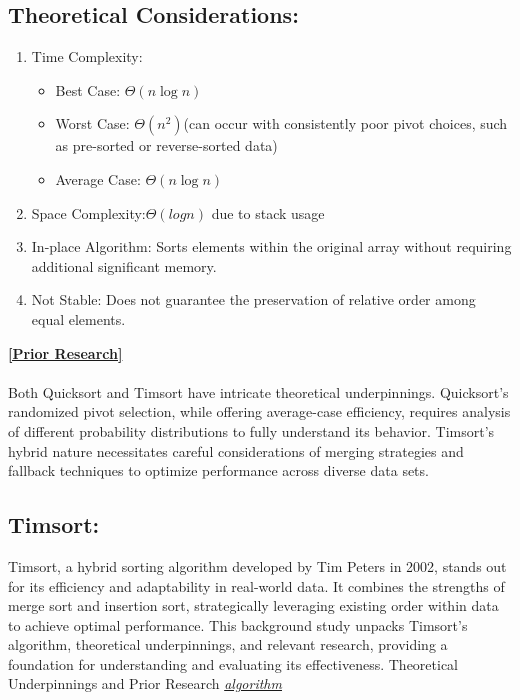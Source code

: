 \documentclass[a4paper, 9pt, twocolumn]{article}
\begin{document}
\subsection*{Theoretical Considerations:}
\begin{enumerate}
  \item Time Complexity:
        \begin{itemize}
          \item Best Case: $\Theta(n\log n)$
          \item Worst Case: $\Theta(n^2)$(can occur with consistently poor pivot choices, such as pre-sorted or reverse-sorted data)
          \item Average Case: $\Theta(n\log n)$
        \end{itemize}
  \item Space Complexity:$\Theta(log n)$ due to stack usage
  \item In-place Algorithm: Sorts elements within the original array without requiring additional significant memory.
  \item Not Stable: Does not guarantee the preservation of relative order among equal elements.
\end{enumerate}
\hyperref[hoare1961]{\textbf{[Prior Research]}}\\\\

Both Quicksort and Timsort have intricate theoretical underpinnings. Quicksort's randomized pivot selection, while offering average-case efficiency, requires analysis of different probability distributions to fully understand its behavior. Timsort's hybrid nature necessitates careful considerations of merging strategies and fallback techniques to optimize performance across diverse data sets.

\subsection*{Timsort:}
Timsort, a hybrid sorting algorithm developed by Tim Peters in 2002, stands out for its efficiency and adaptability in real-world data. It combines the strengths of merge sort and insertion sort, strategically leveraging existing order within data to achieve optimal performance. This background study unpacks Timsort's algorithm, theoretical underpinnings, and relevant research, providing a foundation for understanding and evaluating its effectiveness.
Theoretical Underpinnings and Prior Research
\textit{\underline{algorithm}}
\end{document}
